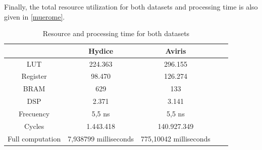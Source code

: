 Finally, the total resource utilization for both datasets and processing time is also given in \autoref{muerome}.
\begin{table}[h!]
\begin{center}
 \begin{tabular}{|c|c|c|c|c|} 
 \hline
  & Hydice & Aviris\\ [0.5ex] 
 \hline\hline
 LUT & 224.363 & 296.155\\ 
 \hline
 Register & 98.470 & 126.274\\ 
 \hline
 BRAM & 629 & 133\\ 
 \hline
 DSP & 2.371 & 3.141\\ 
 \hline
 Frecuency & 5,5 ns & 5,5 ns\\ 
 \hline
 Cycles & 1.443.418 & 140.927.349\\ 
 \hline
 Full computation & 7,938799 milliseconds & 775,10042 milliseconds\\ 
 \hline
\end{tabular}
\end{center}
\label{muerome}
\caption[Final resource and time results for the implementation]{Resource and processing time for both datasets}
\end{table}